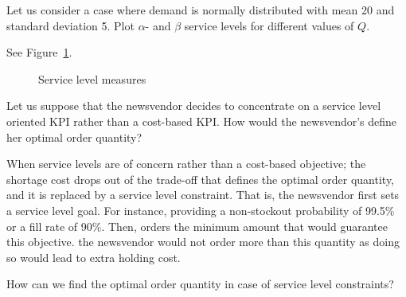 \begin{question}
Let us consider a case where demand is normally distributed with mean 20 and standard deviation 5. Plot $\alpha$- and $\beta$ service levels for different values of $Q$.
\end{question}

\begin{solution}
See Figure~\ref{fig:service}.
\begin{figure}[htbp]
\centering
{}
\caption{Service level measures}
\label{fig:service}
\end{figure}
\end{solution}

\begin{question}
Let us suppose that the newsvendor decides to concentrate on a service level oriented KPI rather than a cost-based KPI. How would the newsvendor's define her optimal order quantity?
\end{question}

\begin{solution}
When service levels are of concern rather than a cost-based objective; the shortage cost drops out of the trade-off that defines the optimal order quantity, and it is replaced by a service level constraint. That is, the newsvendor first sets a service level goal. For instance, providing a non-stockout probability of 99.5\% or a fill rate of 90\%. Then, orders the minimum amount that would guarantee this objective. the newsvendor would not order more than this quantity as doing so would lead to extra holding cost.
\end{solution}

\begin{question}
How can we find the optimal order quantity in case of service level constraints?
\end{question}

